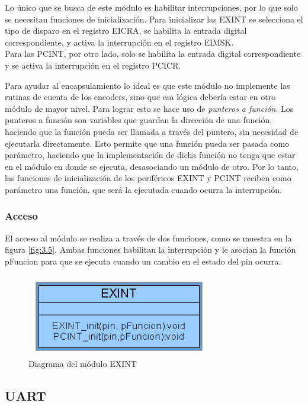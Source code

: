 Lo único que se busca de este módulo es habilitar interrupciones, por lo que solo se necesitan funciones de inicialización.
Para inicializar las EXINT se selecciona el tipo de disparo en el registro EICRA, se habilita la entrada digital correspondiente, y activa la interrupción en el registro EIMSK.\\
Para las PCINT, por otro lado, solo se habilita la entrada digital correspondiente y se activa la interrupción en el registro PCICR.

Para ayudar al encapsulamiento lo ideal es que este módulo no implemente las rutinas de cuenta de los encoders, sino que esa lógica debería estar en otro módulo de mayor nivel. Para lograr esto se hace uso de \textit{punteros a función}. Los punteros a función son variables que guardan la dirección de una función, haciendo que la función pueda ser llamada a través del puntero, sin necesidad de ejecutarla directamente.
Esto permite que una función pueda ser pasada como parámetro, haciendo que la implementación de dicha función no tenga que estar en el módulo en donde se ejecuta, desasociando un módulo de otro. Por lo tanto, las funciones de inicialización de los periféricos EXINT y PCINT reciben como parámetro una función, que será la ejecutada cuando ocurra la interrupción.

\subsubsection{Acceso}
El acceso al módulo se realiza a través de dos funciones, como se muestra en la figura \ref{fig:3.5}. Ambas funciones habilitan la interrupción y le asocian la función pFuncion para que se ejecuta cuando un cambio en el estado del pin ocurra.

\begin{figure}[!ht]
	\centering
	\includegraphics[width=8cm,scale=1]{resources/3_5-moduloEXINT.png}
	\caption{Diagrama del módulo EXINT}
	\label{fig:\thefigure}
\end{figure}


\subsection{UART}
